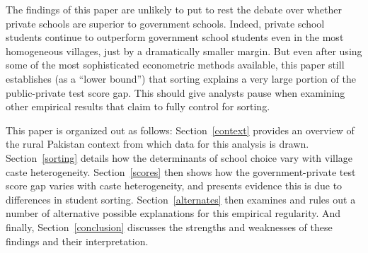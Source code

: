 \documentclass[Eubank_pk_ethnic_sorting.tex]{subfiles}
\begin{document}
The findings of this paper are unlikely to put to rest the debate over whether private schools are superior to government schools. Indeed, private school students continue to outperform government school students even in the most homogeneous villages, just by a dramatically smaller margin. But even after using some of the most sophisticated econometric methods available, this paper still establishes (as a  ``lower bound'') that sorting explains a very large portion of the public-private test score gap. This should give analysts pause when examining other empirical results that claim to fully control for sorting. 

This paper is organized out as follows: Section~\ref{context} provides an overview of the rural Pakistan context from which data for this analysis is drawn. Section~\ref{sorting} details how the determinants of school choice vary with village caste heterogeneity. Section~\ref{scores} then shows how the government-private test score gap varies with caste heterogeneity, and presents evidence this is due to differences in student sorting. Section~\ref{alternates} then examines and rules out a number of alternative possible explanations for this empirical regularity. And finally, Section~\ref{conclusion} discusses the strengths and weaknesses of these findings and their interpretation. 
\end{document}
